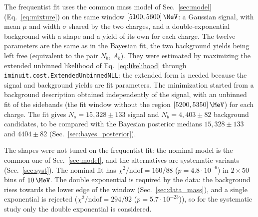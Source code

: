 The frequentist fit uses the common mass model of Sec.~\ref{sec:model} (Eq.~\eqref{eq:mixture}) on the same window $[5100,5600]\,\MeV$: a Gaussian signal, with mean $\mu$ and width $\sigma$ shared by the two charges, and a double-exponential background with a shape and a yield of its own for each charge. The twelve parameters are the same as in the Bayesian fit, the two background yields being left free (equivalent to the pair $N_b$, $A_b$). They were estimated by maximizing the extended unbinned likelihood of Eq.~\eqref{eq:likelihood} through \texttt{iminuit.cost.ExtendedUnbinnedNLL}: the extended form is needed because the signal and background yields are fit parameters. The minimization started from a background description obtained independently of the signal, with an unbinned fit of the sidebands (the fit window without the region $[5200,5350]\,\MeV$) for each charge. The fit gives $N_s=15{,}328\pm133$ signal and $N_b=4{,}403\pm82$ background candidates, to be compared with the Bayesian posterior medians $15{,}328\pm133$ and $4404\pm82$ (Sec.~\ref{sec:bayes_posterior}).

The shapes were not tuned on the frequentist fit: the nominal model is the common one of Sec.~\ref{sec:model}, and the alternatives are systematic variants (Sec.~\ref{sec:syst}). The nominal fit has $\chi^2/\mathrm{ndof}=160/88$ ($p=4.8\cdot 10^{-6}$) in $2\times50$ bins of $10\,\MeV$.
The double exponential is required by the data: the background rises towards the lower edge of the window (Sec.~\ref{sec:data_mass}), and a single exponential is rejected ($\chi^2/\mathrm{ndof}=294/92$ ($p=5.7\cdot 10^{-23}$)), so for the systematic study only the double exponential is considered.

